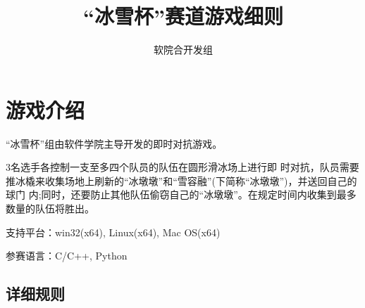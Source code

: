 \documentclass[UTF8]{article}
\title{“冰雪杯”赛道游戏细则}
\author{软院合开发组}
\begin{document}
\maketitle


\section{游戏介绍}

“冰雪杯”组由软件学院主导开发的即时对抗游戏。

3名选手各控制一支至多四个队员的队伍在圆形滑冰场上进行即 时对抗，队员需要推冰橇来收集场地上刷新的“冰墩墩”和“雪容融”(下简称“冰墩墩”)，并送回自己的球门 内;同时，还要防止其他队伍偷窃自己的“冰墩墩”。在规定时间内收集到最多数量的队伍将胜出。

支持平台：win32(x64), Linux(x64), Mac OS(x64)

参赛语言：C/C++, Python

\hypertarget{header-n7}{%
\subsection{详细规则}\label{header-n7}}
\end{document}
